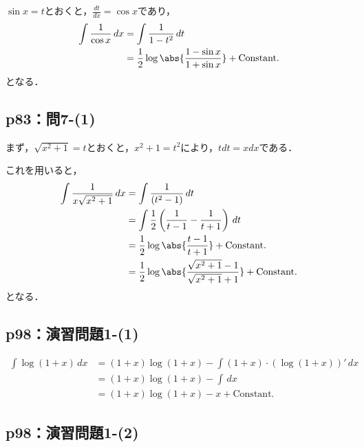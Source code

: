 \documentclass[uplatex,dvipdfmx,a4paper,10pt,fleqn]{jsarticle}
\begin{document}
\begin{tleftbar}
    $ \sin x = t$とおくと，$\frac{dt}{dx}= \cos x$であり，
    \begin{align*} 
        \int \frac{1}{\cos x}\, dx & = \int \frac{1}{1-t^2} \, dt \\
        & = \frac{1}{2} \log \abs{\frac{1-\sin x}{1+\sin x}} + \mathrm{Constant.}
    \end{align*}
    となる．
\end{tleftbar}


\subsection*{p83：問7-(1)}

\begin{tleftbar}
    まず，$ \sqrt{x^2+1}=t$とおくと，$x^2 + 1 = t^2$により，$ t dt = x dx $である．

    これを用いると，
    \begin{align*}
        \int \frac{1}{x\sqrt{x^2+1}} \, dx & = \int \frac{1}{(t^2-1)} \, dt \\
        & = \int  \frac{1}{2} \left (\frac{1}{t-1}-\frac{1}{t+1} \right ) \, dt \\
        & = \frac{1}{2} \log \abs{\frac{t-1}{t+1}} + \mathrm{Constant.} \\
        & = \frac{1}{2} \log \abs{\frac{\sqrt{x^2+1}-1}{\sqrt{x^2+1}+1}} +\mathrm{Constant.} 
    \end{align*}
    となる．
\end{tleftbar}


\subsection*{p98：演習問題1-(1)}

\begin{tleftbar}
    \begin{align*} 
        \int \log (1+x)\, dx & = (1+x) \log (1+x) - \int (1+x) \cdot (\log (1+x))' \, dx \\
        & = (1+x) \log (1+x) - \int \, dx \\
        & = (1+x) \log (1+x) - x +\mathrm{Constant.}
    \end{align*} 
\end{tleftbar}


\subsection*{p98：演習問題1-(2)}
\end{document}
